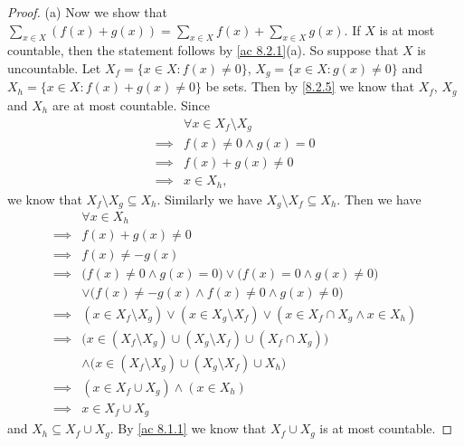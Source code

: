 \begin{proof}{(a)}
  Now we show that \(\sum_{x \in X} (f(x) + g(x)) = \sum_{x \in X} f(x) + \sum_{x \in X} g(x)\).
  If \(X\) is at most countable, then the statement follows by \cref{ac 8.2.1}(a).
  So suppose that \(X\) is uncountable.
  Let \(X_f = \{x \in X : f(x) \neq 0\}\), \(X_g = \{x \in X : g(x) \neq 0\}\) and \(X_h = \{x \in X : f(x) + g(x) \neq 0\}\) be sets.
  Then by \cref{8.2.5} we know that \(X_f\), \(X_g\) and \(X_h\) are at most countable.
  Since
  \begin{align*}
             & \forall x \in X_f \setminus X_g \\
    \implies & f(x) \neq 0 \land g(x) = 0      \\
    \implies & f(x) + g(x) \neq 0              \\
    \implies & x \in X_h,
  \end{align*}
  we know that \(X_f \setminus X_g \subseteq X_h\).
  Similarly we have \(X_g \setminus X_f \subseteq X_h\).
  Then we have
  \begin{align*}
             & \forall x \in X_h                                                                                  \\
    \implies & f(x) + g(x) \neq 0                                                                                 \\
    \implies & f(x) \neq -g(x)                                                                                    \\
    \implies & \big(f(x) \neq 0 \land g(x) = 0\big) \lor \big(f(x) = 0 \land g(x) \neq 0\big)                     \\
             & \lor \big(f(x) \neq -g(x) \land f(x) \neq 0 \land g(x) \neq 0\big)                                 \\
    \implies & (x \in X_f \setminus X_g) \lor (x \in X_g \setminus X_f) \lor (x \in X_f \cap X_g \land x \in X_h) \\
    \implies & \big(x \in (X_f \setminus X_g) \cup (X_g \setminus X_f) \cup (X_f \cap X_g)\big)                   \\
             & \land \big(x \in (X_f \setminus X_g) \cup (X_g \setminus X_f) \cup X_h\big)                        \\
    \implies & (x \in X_f \cup X_g) \land (x \in X_h)                                                             \\
    \implies & x \in X_f \cup X_g
  \end{align*}
  and \(X_h \subseteq X_f \cup X_g\).
  By \cref{ac 8.1.1} we know that \(X_f \cup X_g\) is at most countable.

\end{proof}
